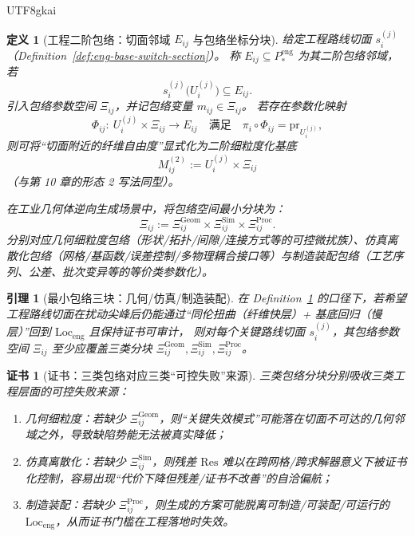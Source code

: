 \documentclass[12pt]{article}
\newtheorem{definition}{定义}[section]
\newtheorem{lemma}{引理}[section]
\newtheorem{certificate}{证书}[section]
\begin{document}
\begin{CJK*}{UTF8}{gkai}
\begin{definition}[工程二阶包络：切面邻域 $E_{ij}$ 与包络坐标分块]
\label{def:eng-envelope}
给定工程路线切面 $s_i^{(j)}$（Definition~\ref{def:eng-base-switch-section}）。
称 $E_{ij}\subseteq P_\ast^{\mathrm{eng}}$ 为其二阶包络邻域，若
\[
s_i^{(j)}\bigl(U_i^{(j)}\bigr)\subseteq E_{ij}.
\]
引入包络参数空间 $\Xi_{ij}$，并记包络变量 $m_{ij}\in\Xi_{ij}$。
若存在参数化映射
\[
\Phi_{ij}:\ U_i^{(j)}\times \Xi_{ij}\to E_{ij}
\quad\text{满足}\quad
\pi_i\circ \Phi_{ij}=\mathrm{pr}_{U_i^{(j)}},
\]
则可将“切面附近的纤维自由度”显式化为二阶细粒度化基底
\[
M_{ij}^{(2)}:=U_i^{(j)}\times \Xi_{ij}
\]
（与第 10 章的形态 2 写法同型）。

在工业几何体逆向生成场景中，将包络空间最小分块为：
\[
\Xi_{ij}
:=
\Xi_{ij}^{\mathrm{Geom}}
\times
\Xi_{ij}^{\mathrm{Sim}}
\times
\Xi_{ij}^{\mathrm{Proc}}.
\]
分别对应几何细粒度包络（形状/拓扑/间隙/连接方式等的可控微扰族）、仿真离散化包络（网格/基函数/误差控制/多物理耦合接口等）与制造装配包络（工艺序列、公差、批次变异等的等价类参数化）。
\end{definition}

\begin{lemma}[最小包络三块：几何/仿真/制造装配]
\label{lem:eng-envelope-minimal-three}
在 Definition~\ref{def:eng-envelope} 的口径下，若希望工程路线切面在扰动尖峰后仍能通过“同伦扭曲（纤维快层）+ 基底回归（慢层）”回到 $\mathrm{Loc}_{\mathrm{eng}}$
  且保持证书可审计，
则对每个关键路线切面 $s_i^{(j)}$，其包络参数空间 $\Xi_{ij}$ 至少应覆盖三类分块
$\Xi_{ij}^{\mathrm{Geom}},\Xi_{ij}^{\mathrm{Sim}},\Xi_{ij}^{\mathrm{Proc}}$。
\end{lemma}

\begin{certificate}[证书：三类包络对应三类“可控失败”来源]
\label{cert:eng-envelope-minimal-three}
三类包络分块分别吸收三类工程层面的可控失败来源：
\begin{enumerate}
  \item 几何细粒度：若缺少 $\Xi_{ij}^{\mathrm{Geom}}$，则“关键失效模式”可能落在切面不可达的几何邻域之外，导致缺陷势能无法被真实降低；
  \item 仿真离散化：若缺少 $\Xi_{ij}^{\mathrm{Sim}}$，则残差 $\mathrm{Res}$ 难以在跨网格/跨求解器意义下被证书化控制，容易出现“代价下降但残差/证书不改善”的自洽偏航；
  \item 制造装配：若缺少 $\Xi_{ij}^{\mathrm{Proc}}$，则生成的方案可能脱离可制造/可装配/可运行的 $\mathrm{Loc}_{\mathrm{eng}}$，从而证书门槛在工程落地时失效。
\end{enumerate}
\end{certificate}


\end{CJK*}
\end{document}
